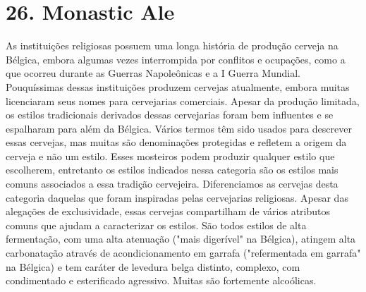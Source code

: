 \section*{26. Monastic Ale}

As instituições religiosas possuem uma longa história de produção cerveja na Bélgica, embora algumas vezes interrompida por conflitos e ocupações, como a que ocorreu durante as Guerras Napoleônicas e a I Guerra Mundial. Pouquíssimas dessas instituições produzem cervejas atualmente, embora muitas licenciaram seus nomes para cervejarias comerciais. Apesar da produção limitada, os estilos tradicionais derivados dessas cervejarias foram bem influentes e se espalharam para além da Bélgica. Vários termos têm sido usados para descrever essas cervejas, mas muitas são denominações protegidas e refletem a origem da cerveja e não um estilo. Esses mosteiros podem produzir qualquer estilo que escolherem, entretanto os estilos indicados nessa categoria são os estilos mais comuns associados a essa tradição cervejeira. Diferenciamos as cervejas desta categoria daquelas que foram inspiradas pelas cervejarias religiosas. Apesar das alegações de exclusividade, essas cervejas compartilham de vários atributos comuns que ajudam a caracterizar os estilos. São todos estilos de alta fermentação, com uma alta atenuação ("mais digerível" na Bélgica), atingem alta carbonatação através de acondicionamento em garrafa ("refermentada em garrafa" na Bélgica) e tem caráter de levedura belga distinto, complexo, com condimentado e esterificado agressivo. Muitas são fortemente alcoólicas.